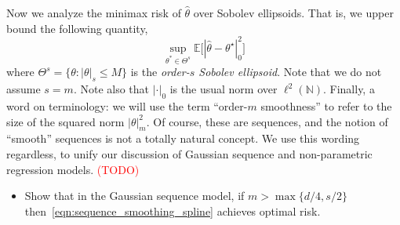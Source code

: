 \documentclass{article}
\newcommand{\1}{\mathbf{1}}
\newcommand{\Ebb}{\mathbb{E}}
\newcommand{\wh}[1]{\widehat{#1}}
\theoremstyle{alden}
\theoremstyle{aldenthm}
\theoremstyle{definition}
\theoremstyle{remark}
\begin{document}
Now we analyze the minimax risk of $\wh{\theta}$ over Sobolev ellipsoids. That is, we upper bound the following quantity,
\begin{equation*}
\sup_{\theta^{\ast} \in \Theta^s} \Ebb\bigl[|\wh{\theta} - \theta^{\star}|_{0}^2\bigr]
\end{equation*}
where $\Theta^s = \{\theta: |\theta|_s \leq M\}$ is the \emph{order-$s$ Sobolev ellipsoid}. Note that we do not assume $s = m$. Note also that $|\cdot|_0$ is the usual norm over $\ell^2(\mathbb{N})$. Finally, a word on terminology: we will use the term ``order-$m$ smoothness'' to refer to the size of the squared norm $|\theta|_m^2$. Of course, these are sequences, and the notion of ``smooth'' sequences is not a totally natural concept. We use this wording regardless, to unify our discussion of Gaussian sequence and non-parametric regression models.
\textcolor{red}{(TODO)}
\begin{itemize}
	\item Show that in the Gaussian sequence model, if $m > \max\{d/4,s/2\}$ then~\eqref{eqn:sequence_smoothing_spline} achieves optimal risk.
\end{itemize}
\end{document}
